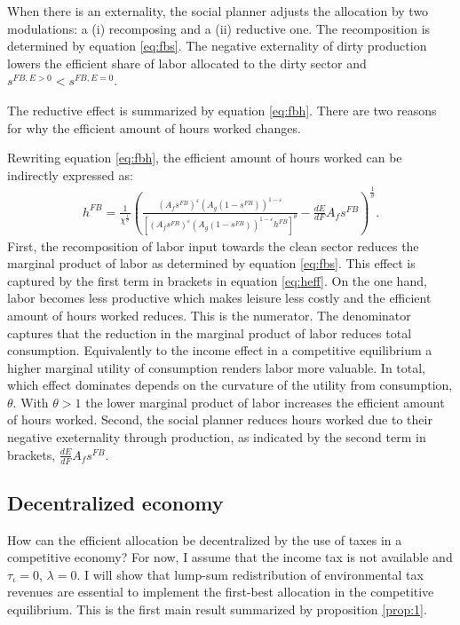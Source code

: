 When there is an externality, the social planner adjusts the allocation by two modulations: a (i) recomposing and a (ii) reductive one. 
The recomposition is determined by equation \ref{eq:fbs}. The negative externality of dirty production lowers the efficient share of labor allocated to  the dirty sector and $s^{FB,E>0}<s^{FB,E=0}$. 

The reductive effect is summarized by equation \ref{eq:fbh}. There are two reasons for why the efficient amount of hours worked changes. 


 
Rewriting equation \ref{eq:fbh}, the efficient amount of hours worked can be indirectly expressed as:
\begin{align}
h^{FB}=\frac{1}{\chi^\frac{1}{\sigma}}\left(\frac{(A_f s^{FB})^{\varepsilon}(A_g(1-s^{FB}))^{1-\varepsilon}}{\left[(A_f s^{FB})^{\varepsilon}(A_g(1-s^{FB}))^{1-\varepsilon}h^{FB}\right]^{\theta}}-\frac{dE}{dF}A_f s^{FB} \right)^\frac{1}{\sigma}.\label{eq:heff}
\end{align}
First, the recomposition of labor input towards the  clean sector reduces the marginal product of labor as determined by equation \ref{eq:fbs}. This effect is captured by
 the first term in brackets in equation \ref{eq:heff}. On the one hand, labor becomes less productive which makes leisure less costly and the efficient amount of hours worked reduces. This is the numerator. The denominator captures that the reduction in the marginal product of labor reduces total consumption. Equivalently to the income effect in a competitive equilibrium a higher marginal utility of consumption renders labor more valuable. In total, which effect dominates depends on the curvature of the utility from consumption, $\theta$. With $\theta>1$ the  lower marginal product of labor increases the efficient amount of hours worked. 
Second, the social planner reduces hours worked due to their negative exeternality through production, as indicated by the second term in brackets, $\frac{dE}{dF}A_fs^{FB}$.



\subsection{Decentralized economy}
How can the efficient allocation be decentralized by the use of taxes in a competitive economy? For now, I assume that the income tax is not available and $\tau_{\iota}=0$, $\lambda=0$.
I will show that lump-sum redistribution of environmental tax revenues are essential to implement the first-best allocation in the competitive equilibrium. This is the first main result summarized by proposition \ref{prop:1}. 

